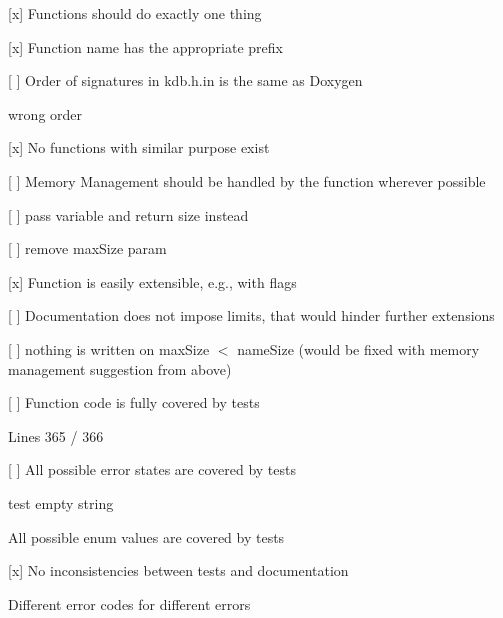 \begin{DoxyItemize}
\item \mbox{[}x\mbox{]} Functions should do exactly one thing
\item \mbox{[}x\mbox{]} Function name has the appropriate prefix
\item \mbox{[} \mbox{]} Order of signatures in kdb.\+h.\+in is the same as Doxygen
\begin{DoxyItemize}
\item wrong order
\end{DoxyItemize}
\item \mbox{[}x\mbox{]} No functions with similar purpose exist
\end{DoxyItemize}


\begin{DoxyItemize}
\item \mbox{[} \mbox{]} Memory Management should be handled by the function wherever possible
\begin{DoxyItemize}
\item \mbox{[} \mbox{]} pass variable and return size instead
\item \mbox{[} \mbox{]} remove {\ttfamily max\+Size} param
\end{DoxyItemize}
\end{DoxyItemize}


\begin{DoxyItemize}
\item \mbox{[}x\mbox{]} Function is easily extensible, e.\+g., with flags
\item \mbox{[} \mbox{]} Documentation does not impose limits, that would hinder further extensions
\begin{DoxyItemize}
\item \mbox{[} \mbox{]} nothing is written on max\+Size $<$ name\+Size (would be fixed with memory management suggestion from above)
\end{DoxyItemize}
\end{DoxyItemize}


\begin{DoxyItemize}
\item \mbox{[} \mbox{]} Function code is fully covered by tests
\begin{DoxyItemize}
\item Lines 365 / 366
\end{DoxyItemize}
\item \mbox{[} \mbox{]} All possible error states are covered by tests
\begin{DoxyItemize}
\item test empty string
\end{DoxyItemize}
\item All possible enum values are covered by tests
\item \mbox{[}x\mbox{]} No inconsistencies between tests and documentation
\end{DoxyItemize}

Different error codes for different errors